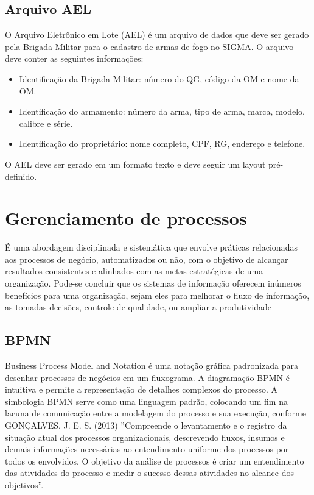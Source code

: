 \subsection{Arquivo AEL}
O Arquivo Eletrônico em Lote (AEL) é um arquivo de dados que deve ser gerado pela Brigada Militar para o cadastro de armas de fogo no SIGMA. O arquivo deve conter as seguintes informações:
\begin{itemize}
    \item Identificação da Brigada Militar: número do QG, código da OM e nome da OM.
    \item Identificação do armamento: número da arma, tipo de arma, marca, modelo, calibre e série.
    \item Identificação do proprietário: nome completo, CPF, RG, endereço e telefone.
\end{itemize}\cite{ExércitoBrasileiro}

O AEL deve ser gerado em um formato texto e deve seguir um layout pré-definido.\cite{ebInstrucaoAdministrativa} 
\section{Gerenciamento de processos}
É uma abordagem disciplinada e sistemática que envolve práticas relacionadas aos processos de negócio, automatizados ou não, com o objetivo de alcançar resultados consistentes e alinhados com as metas estratégicas de uma organização. Pode-se concluir que os sistemas de informação oferecem inúmeros benefícios para uma organização, sejam eles para melhorar o fluxo de informação, as tomadas decisões, controle de qualidade, ou ampliar a produtividade

\subsection{BPMN}
Business Process Model and Notation é uma notação gráfica padronizada para desenhar processos de negócios em um fluxograma. A diagramação BPMN é intuitiva e permite a representação de detalhes complexos do processo. A simbologia BPMN serve como uma linguagem padrão, colocando um fim na lacuna de comunicação entre a modelagem do processo e sua execução, conforme GONÇALVES, J. E. S. (2013) ''Compreende o levantamento e o registro da situação atual dos processos organizacionais, descrevendo fluxos, insumos e demais informações necessárias ao entendimento uniforme dos processos por todos os envolvidos. O objetivo da análise de processos é criar um entendimento das atividades do processo e medir o sucesso dessas atividades no alcance dos objetivos''.


